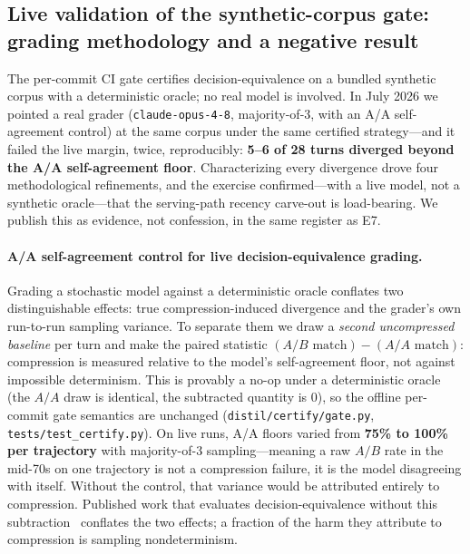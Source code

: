\documentclass{article}
\begin{document}
\subsection{Live validation of the synthetic-corpus gate: grading methodology and a negative
  result}
\label{sec:livecert}

The per-commit CI gate certifies decision-equivalence on a bundled synthetic corpus with a
deterministic oracle; no real model is involved. In July 2026 we pointed a real grader
(\texttt{claude-opus-4-8}, majority-of-3, with an A/A self-agreement control) at the same
corpus under the same certified strategy---and it failed the live margin, twice, reproducibly:
\textbf{5--6 of 28 turns diverged beyond the A/A self-agreement floor}. Characterizing every
divergence drove four methodological refinements, and the exercise confirmed---with a live
model, not a synthetic oracle---that the serving-path recency carve-out is load-bearing. We
publish this as evidence, not confession, in the same register as E7.

\paragraph{A/A self-agreement control for live decision-equivalence grading.}
Grading a stochastic model against a deterministic oracle conflates two distinguishable
effects: true compression-induced divergence and the grader's own run-to-run sampling
variance. To separate them we draw a \emph{second uncompressed baseline} per turn and make the
paired statistic $(A/B\text{ match}) - (A/A\text{ match})$: compression is measured relative
to the model's self-agreement floor, not against impossible determinism. This is provably a
no-op under a deterministic oracle (the $A/A$ draw is identical, the subtracted quantity is
$0$), so the offline per-commit gate semantics are unchanged
(\texttt{distil/certify/gate.py}, \texttt{tests/test\_certify.py}). On live
runs, A/A floors varied from \textbf{75\% to 100\% per trajectory} with majority-of-3
sampling---meaning a raw $A/B$ rate in the mid-70s on one trajectory is not a compression
failure, it is the model disagreeing with itself. Without the control, that variance would be
attributed entirely to compression. Published work that evaluates decision-equivalence without
this subtraction~\cite{acon,contextcodec,damc} conflates the two effects; a fraction of the
harm they attribute to compression is sampling nondeterminism.
\end{document}
